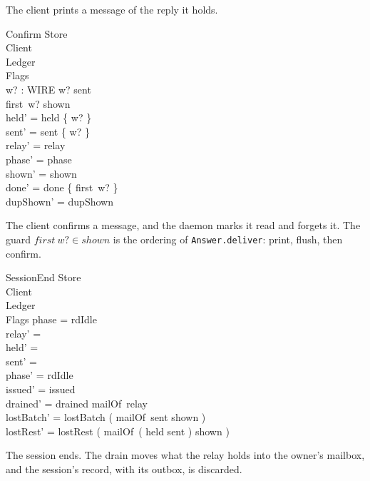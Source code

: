\documentclass[a4paper,10pt,fleqn]{article}
\begin{document}
The client prints a message of the reply it holds.

\begin{schema}{Confirm}
  \Delta Store \\
  \Delta Client \\
  \Xi Ledger \\
  \Xi Flags \\
  w? : WIRE
  \where
  w? \in sent \\
  first~w? \in shown \\
  held' = held \setminus \{ w? \} \\
  sent' = sent \setminus \{ w? \} \\
  relay' = relay \\
  phase' = phase \\
  shown' = shown \\
  done' = done \cup \{ first~w? \} \\
  dupShown' = dupShown
\end{schema}

The client confirms a message, and the daemon marks it read and forgets it.
The guard $first~w? \in shown$ is the ordering of \texttt{Answer.deliver}:
print, flush, then confirm.

\begin{schema}{SessionEnd}
  \Delta Store \\
  \Xi Client \\
  \Delta Ledger \\
  \Xi Flags
  \where
  phase = rdIdle \\
  relay' = \emptyset \\
  held' = \emptyset \\
  sent' = \emptyset \\
  phase' = rdIdle \\
  issued' = issued \\
  drained' = drained \cup mailOf~relay \\
  lostBatch' = lostBatch \cup ( mailOf~sent \setminus shown ) \\
  lostRest' = lostRest \cup ( mailOf~( held \setminus sent ) \setminus shown )
\end{schema}

The session ends.  The drain moves what the relay holds into the owner's
mailbox, and the session's record, with its outbox, is discarded.
\end{document}

